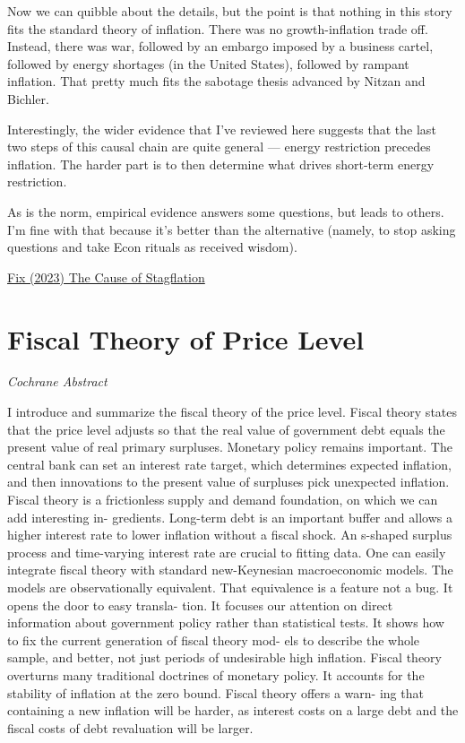 \documentclass[
]{book}
\begin{document}
Now we can quibble about the details, but the point is that nothing in this story fits the standard theory of inflation. There was no growth-inflation trade off. Instead, there was war, followed by an embargo imposed by a business cartel, followed by energy shortages (in the United States), followed by rampant inflation. That pretty much fits the sabotage thesis advanced by Nitzan and Bichler.

Interestingly, the wider evidence that I've reviewed here suggests that the last two steps of this causal chain are quite general --- energy restriction precedes inflation. The harder part is to then determine what drives short-term energy restriction.

As is the norm, empirical evidence answers some questions, but leads to others. I'm fine with that because it's better than the alternative (namely, to stop asking questions and take Econ rituals as received wisdom).

\href{https://economicsfromthetopdown.com/2023/01/26/the-cause-of-stagflation/}{Fix (2023) The Cause of Stagflation}

\hypertarget{fiscal-theory-of-price-level}{%
\section{Fiscal Theory of Price Level}\label{fiscal-theory-of-price-level}}

\emph{Cochrane Abstract}

I introduce and summarize the fiscal theory of the price level. Fiscal theory states
that the price level adjusts so that the real value of government debt equals the present
value of real primary surpluses. Monetary policy remains important. The central
bank can set an interest rate target, which determines expected inflation, and then
innovations to the present value of surpluses pick unexpected inflation. Fiscal theory
is a frictionless supply and demand foundation, on which we can add interesting in-
gredients. Long-term debt is an important buffer and allows a higher interest rate to
lower inflation without a fiscal shock. An s-shaped surplus process and time-varying
interest rate are crucial to fitting data. One can easily integrate fiscal theory with
standard new-Keynesian macroeconomic models. The models are observationally
equivalent. That equivalence is a feature not a bug. It opens the door to easy transla-
tion. It focuses our attention on direct information about government policy rather
than statistical tests. It shows how to fix the current generation of fiscal theory mod-
els to describe the whole sample, and better, not just periods of undesirable high
inflation. Fiscal theory overturns many traditional doctrines of monetary policy. It
accounts for the stability of inflation at the zero bound. Fiscal theory offers a warn-
ing that containing a new inflation will be harder, as interest costs on a large debt and
the fiscal costs of debt revaluation will be larger.
\end{document}
